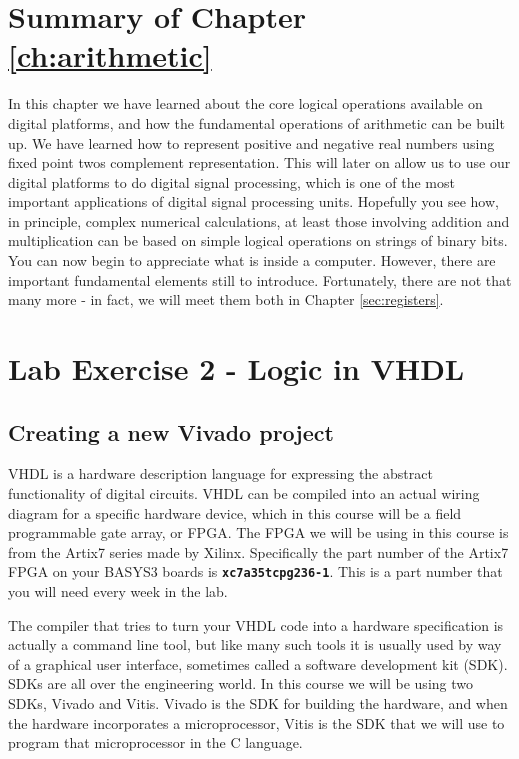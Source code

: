 \documentclass[../physical_computing.tex]{subfiles}
\begin{document}
\section{Summary of Chapter \ref{ch:arithmetic}}
\label{sec:ch1summary}

In this chapter we have learned about the core logical operations
available on digital platforms, and how the fundamental operations
of arithmetic can be built up. We have learned how to represent
positive and negative real numbers using fixed point twos
complement representation. This will later on allow us to use
our digital platforms to do digital signal processing, which is 
one of the most important applications of digital signal processing
units. Hopefully you see how, in principle, complex numerical
calculations, at least those involving addition and multiplication
can be based on simple logical operations on strings of binary 
bits. You can now begin to appreciate what is inside a computer.
However, there are important fundamental elements still to introduce.
Fortunately, there are not that many more - in fact, we will meet
them both in Chapter \ref{sec:registers}.

\section{Lab Exercise 2 - Logic in VHDL}
\label{sec:appendix_2}

\subsection{Creating a new Vivado project}
\label{sec:create_new_vivado_project}

VHDL is a hardware description language for expressing the abstract functionality of digital circuits. VHDL can be compiled into an actual wiring diagram for a specific hardware device, which in this course will be a field programmable gate array, or FPGA. The FPGA we will be using in this course is from the Artix7 series made by Xilinx. Specifically the part number of the Artix7 FPGA on your BASYS3 boards is \texttt{\bf xc7a35tcpg236-1}. This is a part number that you will need every week in the lab. 

The compiler that tries to turn your VHDL code into a hardware specification is actually a command line tool, but like many such tools it is usually used by way of a graphical user interface, sometimes called a software development kit (SDK). SDKs are all over the engineering world. In this course we will be using two SDKs, Vivado and Vitis. Vivado is the SDK for building the hardware, and when the hardware incorporates a microprocessor, Vitis is the SDK that we will use to program that microprocessor in the C language.
\end{document}
